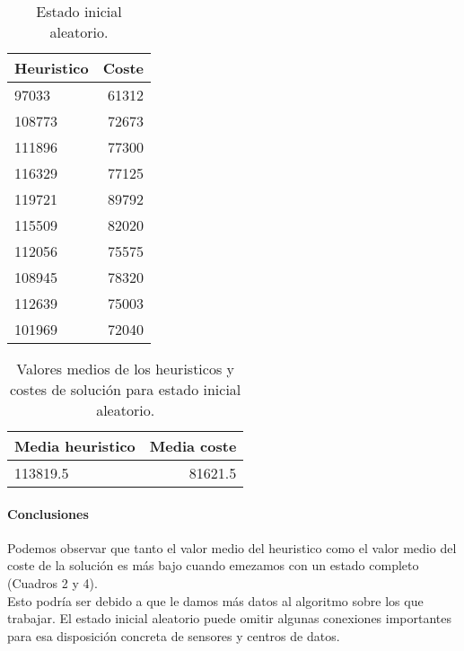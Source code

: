 \begin{table}[htb]
\centering
\begin{tabular}{l|r}
Heuristico & Coste  \\\hline
97033 & 61312 \\
108773 & 72673 \\
111896 & 77300 \\
116329 & 77125 \\
119721 & 89792 \\
115509 & 82020 \\
112056 & 75575 \\
108945 & 78320 \\
112639 & 75003 \\
101969 & 72040 \\

\end{tabular}
\caption{\label{tab:widgets}Estado inicial aleatorio.}
\end{table}

\begin{table}[htb]
\centering
\begin{tabular}{l|r}
Media heuristico & Media coste \\\hline
113819.5 & 81621.5\\
\end{tabular}
\caption{\label{tab:widgets}Valores medios de los heuristicos y costes de solución para estado inicial aleatorio.}
\end{table}


\paragraph{Conclusiones} Podemos observar que tanto el valor medio del heuristico como el valor medio del coste de la solución es más bajo cuando emezamos con un estado completo (Cuadros 2 y 4).\\
Esto podría ser debido a que le damos más datos al algoritmo sobre los que trabajar. El estado inicial aleatorio puede omitir algunas conexiones importantes para esa disposición concreta de sensores y centros de datos.


